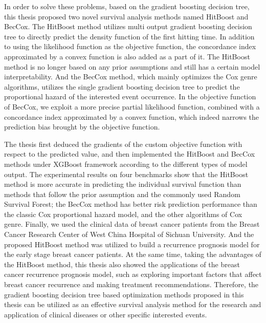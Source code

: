 \begin{englishabstract}
    In order to solve these problems, based on the gradient boosting decision tree, this thesis proposed two novel survival analysis methods named HitBoost and BecCox. The HitBoost method utilizes multi output gradient boosting decision tree to directly predict the density function of the first hitting time. In addition to using the likelihood function as the objective function, the concordance index approximated by a convex function is also added as a part of it. The HitBoost method is no longer based on any prior assumptions and still has a certain model interpretability. And the BecCox method, which mainly optimizes the Cox genre algorithms, utilizes the single gradient boosting decision tree to predict the proportional hazard of the interested event occurrence. In the objective function of BecCox, we exploit a more precise partial likelihood function, combined with a concordance index approximated by a convex function, which indeed narrows the prediction bias brought by the objective function.

	The thesis first deduced the gradients of the custom objective function with respect to the predicted value, and then implemented the HitBoost and BecCox methods under XGBoost framework according to the different types of model output. The experimental results on four benchmarks show that the HitBoost method is more accurate in predicting the individual survival function than methods that follow the prior assumption and the commonly used Random Survival Forest; the BecCox method has better risk prediction performance than the classic Cox proportional hazard model, and the other algorithms of Cox genre. Finally, we used the clinical data of breast cancer patients from the Breast Cancer Research Center of West China Hospital of Sichuan University. And the proposed HitBoost method was utilized to build a recurrence prognosis model for the early stage breast cancer patients. At the same time, taking the advantages of the HitBoost method, this thesis also showed the applications of the breast cancer recurrence prognosis model, such as exploring important factors that affect breast cancer recurrence and making treatment recommendations. Therefore, the gradient boosting decision tree based optimization methods proposed in this thesis can be utilized as an effective survival analysis method for the research and application of clinical diseases or other specific interested events.

\end{englishabstract}


